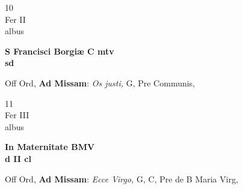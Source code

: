 \documentclass[10pt, openany]{book}
\begin{document}
        \begin{center}
            \begin{minipage}{3.5in}
                \vspace{2em}
                \begin{minipage}{0.5in}
                    {\Huge 10} \\
                    {\normalsize Fer II} \\
                    {\normalsize albus}
                \end{minipage}
                \begin{minipage}{3.0in}
                    \textbf{ \large S Francisci Borgiæ C mtv \\
                    \textnormal{\normalsize sd}} \\ 
                \end{minipage}
                \begin{justify}Off Ord, \textbf{Ad Missam}: \textit{Os justi,} G, Pre Communis,   
                \end{justify}
            \end{minipage}
        \end{center}
    
        \begin{center}
            \begin{minipage}{3.5in}
                \vspace{2em}
                \begin{minipage}{0.5in}
                    {\Huge 11} \\
                    {\normalsize Fer III} \\
                    {\normalsize albus}
                \end{minipage}
                \begin{minipage}{3.0in}
                    \textbf{ \large In Maternitate BMV \\
                    \textnormal{\normalsize d II cl}} \\ 
                \end{minipage}
                \begin{justify}Off Ord, \textbf{Ad Missam}: \textit{Ecce Virgo,} G, C, Pre de B Maria Virg,   
                \end{justify}
            \end{minipage}
        \end{center}
    
\end{document}
